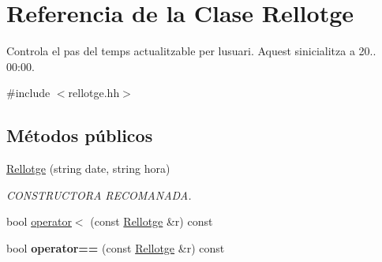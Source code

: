 \hypertarget{class_rellotge}{}\section{Referencia de la Clase Rellotge}
\label{class_rellotge}


Controla el pas del temps actualitzable per l\textquotesingle{}usuari. Aquest s\textquotesingle{}inicialitza a 20.. 00\+:00.  




{\ttfamily \#include $<$rellotge.\+hh$>$}

\subsection*{Métodos públicos}
\begin{DoxyCompactItemize}
\item 
\hyperlink{class_rellotge_a32a5ede4b39b3dfc22a10d93a68d4173}{Rellotge} (string date, string hora)
\begin{DoxyCompactList}\small\item\em C\+O\+N\+S\+T\+R\+U\+C\+T\+O\+R\+A R\+E\+C\+O\+M\+A\+N\+A\+D\+A. \end{DoxyCompactList}\item 
bool \hyperlink{class_rellotge_aec4d03763b1bfed2821e2df4a3923b19}{operator$<$} (const \hyperlink{class_rellotge}{Rellotge} \&r) const 
\item 
\hypertarget{class_rellotge_a65e560f3df49942d58ffa7a1f01b9d3b}{}bool {\bfseries operator==} (const \hyperlink{class_rellotge}{Rellotge} \&r) const \label{class_rellotge_a65e560f3df49942d58ffa7a1f01b9d3b}


\end{DoxyCompactItemize}
